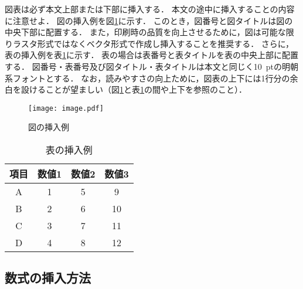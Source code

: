 \documentclass[a4j]{jsarticle}
\begin{document}
図表は必ず本文上部または下部に挿入する．
本文の途中に挿入することの内容に注意せよ．
図の挿入例を図\ref{fig:sample}に示す．
このとき，図番号と図タイトルは図の中央下部に配置する．
また，印刷時の品質を向上させるために，図は可能な限りラスタ形式ではなくベクタ形式で作成し挿入することを推奨する．
さらに，表の挿入例を表\ref{table:sample}に示す．
表の場合は表番号と表タイトルを表の中央上部に配置する．
図番号・表番号及び図タイトル・表タイトルは本文と同じく10~ptの明朝系フォントとする．
なお，読みやすさの向上ために，図表の上下には1行分の余白を設けることが望ましい（図\ref{fig:sample}と表\ref{table:sample}の間や上下を参照のこと）．

\begin{figure}[t]
  \centering
  \vspace{0pt} %
  \texttt{[image: image.pdf]}
  \vspace{0pt} %
  \caption{図の挿入例}
  \vspace{0pt} %
  \label{fig:sample}
\end{figure}

\begin{table}[t]
  \centering
  \caption{表の挿入例}
  \label{table:sample}
  \vspace{0pt} %
  \begin{tabular}{|c|c|c|c|} \hline
    項目 & 数値1 & 数値2 & 数値3 \\ \hline
    A & 1 & 5 &  9 \\ \hline
    B & 2 & 6 & 10 \\ \hline
    C & 3 & 7 & 11 \\ \hline
    D & 4 & 8 & 12 \\ \hline
  \end{tabular}
  \vspace{10pt} %
\end{table}

\subsection{数式の挿入方法}
\end{document}
